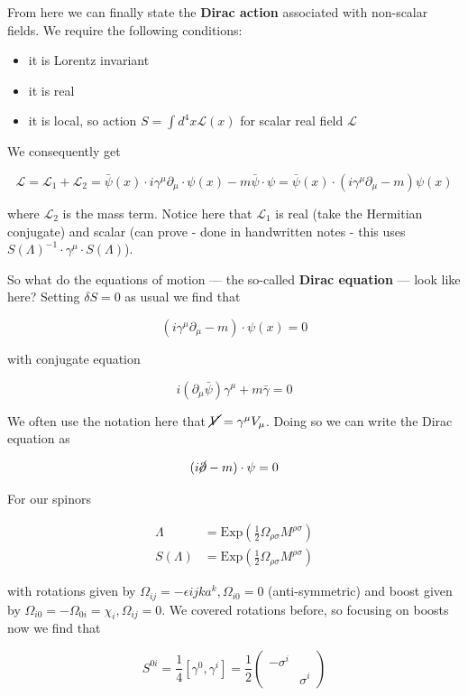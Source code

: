 \documentclass{article}
\theoremstyle{definition}
\begin{document}
From here we can finally state the \textbf{Dirac action} associated with
non-scalar fields. We require the following conditions:

\begin{itemize}
\item it is Lorentz invariant
\item it is real
\item it is local, so action $S = \int d^4x \mathcal{L}(x)$ for scalar real
  field $\mathcal{L}$
\end{itemize}

We consequently get

$$\mathcal{L} = \mathcal{L}_1 + \mathcal{L}_2 = \bar{\psi}(x) \cdot i
\gamma^\mu \partial_\mu \cdot \psi(x) - m \bar{\psi} \cdot \psi = \bar{\psi}(x)
\cdot (i \gamma^\mu \partial_\mu - m) \psi(x) $$ 

where $\mathcal{L}_2$ is the mass term. Notice here that $\mathcal{L}_1$ is real
(take the Hermitian conjugate) and scalar (can prove - done in handwritten notes
- this uses $S(\Lambda)^{-1} \cdot \gamma^\mu \cdot S(\Lambda)$).

So what do the equations of motion --- the so-called \textbf{Dirac equation} ---
look like here? Setting $\delta S = 0$ as usual we find that

$$ (i \gamma^\mu \partial_\mu - m) \cdot \psi(x) = 0 $$

with conjugate equation

$$ i (\partial_\mu \bar{\psi}) \gamma^\mu + m \bar{\gamma} = 0 $$

We often use the notation here that $\cancel{V} = \gamma^\mu V_\mu$. Doing so we
can write the Dirac equation as

$$ (i \cancel{\partial} - m) \cdot \psi = 0 $$

For our spinors

\begin{align*}
  \Lambda &= \text{Exp}(\frac{1}{2} \Omega_{\rho \sigma} M^{\rho \sigma}) \\
  S(\Lambda) &= \text{Exp}(\frac{1}{2} \Omega_{\rho \sigma} M^{\rho \sigma})
\end{align*}

with rotations given by $\Omega_{ij} = -\epsilon{ijk} a^k, \Omega_{i0} = 0$
(anti-symmetric) and boost given by $\Omega_{i0} = - \Omega_{0i} = \chi_i,
\Omega_{ij} = 0$. We covered rotations before, so focusing on boosts now we find
that

$$ S^{0i} = \frac{1}{4} [\gamma^0, \gamma^i] = \frac{1}{2}
\begin{pmatrix}
  -\sigma^i & \\
  & \sigma^i
\end{pmatrix} $$
\end{document}
